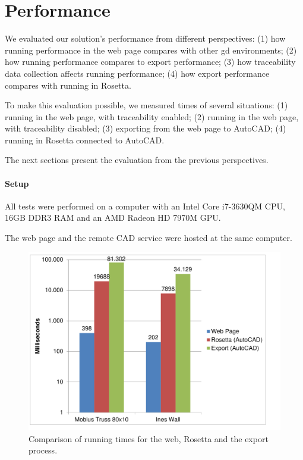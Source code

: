 \section{Performance}
\label{sec:eval:performance}
We evaluated our solution's performance from different perspectives:
(1) how running performance in the web page compares with other \gls{gd} environments;
(2) how running performance compares to export performance;
(3) how traceability data collection affects running performance;
(4) how export performance compares with running in Rosetta.

To make this evaluation possible, we measured times of several situations:
(1) running in the web page, with traceability enabled;
(2) running in the web page, with traceability disabled;
(3) exporting from the web page to AutoCAD;
(4) running in Rosetta connected to AutoCAD.

The next sections present the evaluation from the previous perspectives.

\paragraph{Setup}
All tests were performed on a computer with an Intel Core i7-3630QM CPU, 16GB DDR3 RAM and an AMD Radeon HD 7970M GPU.

The web page and the remote CAD service were hosted at the same computer.


\begin{figure}
  \centering
  \includegraphics[width=12cm]{./images/run_export_rosetta_times}
  \caption{Comparison of running times for the web, Rosetta and the export process.}
  \label{fig:run:export:rosetta:chart}
\end{figure}


